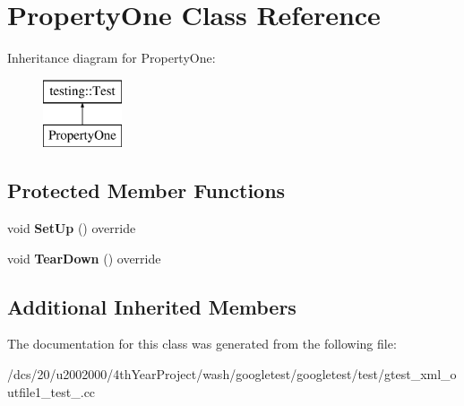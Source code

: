 \hypertarget{classPropertyOne}{}\section{Property\+One Class Reference}
\label{classPropertyOne}
Inheritance diagram for Property\+One\+:\begin{figure}[H]
\begin{center}
\leavevmode
\includegraphics[height=2.000000cm]{classPropertyOne}
\end{center}
\end{figure}
\subsection*{Protected Member Functions}
\begin{DoxyCompactItemize}
\item 
\mbox{\label{classPropertyOne_a0a31b0c199b14438b9cfbd27645aa542}} 
void {\bfseries Set\+Up} () override
\item 
\mbox{\label{classPropertyOne_a0a9a054682c28e32d6b3007e966a1aaf}} 
void {\bfseries Tear\+Down} () override
\end{DoxyCompactItemize}
\subsection*{Additional Inherited Members}


The documentation for this class was generated from the following file\+:\begin{DoxyCompactItemize}
\item 
/dcs/20/u2002000/4th\+Year\+Project/wash/googletest/googletest/test/gtest\+\_\+xml\+\_\+outfile1\+\_\+test\+\_\+.\+cc\end{DoxyCompactItemize}
